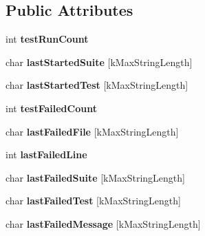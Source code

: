 \subsection*{Public Attributes}
\begin{DoxyCompactItemize}
\item 
\hypertarget{structRecordingReporter_a27b2782320861b3d25158021b3e54859}{int {\bfseries test\-Run\-Count}}\label{structRecordingReporter_a27b2782320861b3d25158021b3e54859}

\item 
\hypertarget{structRecordingReporter_a51904891bff9de877dc9b70be57ef74c}{char {\bfseries last\-Started\-Suite} \mbox{[}k\-Max\-String\-Length\mbox{]}}\label{structRecordingReporter_a51904891bff9de877dc9b70be57ef74c}

\item 
\hypertarget{structRecordingReporter_af88b0f10c3bf4682e461b3bee65f2bae}{char {\bfseries last\-Started\-Test} \mbox{[}k\-Max\-String\-Length\mbox{]}}\label{structRecordingReporter_af88b0f10c3bf4682e461b3bee65f2bae}

\item 
\hypertarget{structRecordingReporter_a0bb590848441de20544dfa7681779266}{int {\bfseries test\-Failed\-Count}}\label{structRecordingReporter_a0bb590848441de20544dfa7681779266}

\item 
\hypertarget{structRecordingReporter_a9996349ac2742047496b3888bb021489}{char {\bfseries last\-Failed\-File} \mbox{[}k\-Max\-String\-Length\mbox{]}}\label{structRecordingReporter_a9996349ac2742047496b3888bb021489}

\item 
\hypertarget{structRecordingReporter_a72a38433a031165d2a49f42347500b65}{int {\bfseries last\-Failed\-Line}}\label{structRecordingReporter_a72a38433a031165d2a49f42347500b65}

\item 
\hypertarget{structRecordingReporter_a5343637d20d52156662a9ac26ef08b53}{char {\bfseries last\-Failed\-Suite} \mbox{[}k\-Max\-String\-Length\mbox{]}}\label{structRecordingReporter_a5343637d20d52156662a9ac26ef08b53}

\item 
\hypertarget{structRecordingReporter_a7fd128c233a57bc3e1d7d62b6f2f874f}{char {\bfseries last\-Failed\-Test} \mbox{[}k\-Max\-String\-Length\mbox{]}}\label{structRecordingReporter_a7fd128c233a57bc3e1d7d62b6f2f874f}

\item 
\hypertarget{structRecordingReporter_a78a8e2ca635c0cc3194cd444047c13c9}{char {\bfseries last\-Failed\-Message} \mbox{[}k\-Max\-String\-Length\mbox{]}}\label{structRecordingReporter_a78a8e2ca635c0cc3194cd444047c13c9}


\end{DoxyCompactItemize}
